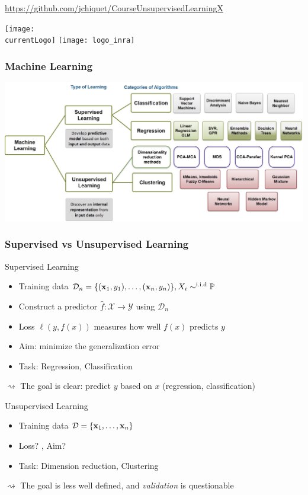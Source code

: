 \documentclass{beamer}\usepackage[]{graphicx}\usepackage[]{color}
\title{\currentCourse}
\subtitle{\huge\currentChapter\normalsize}
\institute{\currentInstitute}
\date{\currentDate}
\def\currentLogo{../common_figs/logo_X}
\newcommand{\dotitlepage}{%
  \begin{frame}
    \titlepage
    \vfill
    \begin{center}
        \scriptsize\url{https://github.com/jchiquet/CourseUnsupervisedLearningX}
    \end{center}
    \vfill
    \texttt{[image: \\currentLogo]}\hfill
    \texttt{[image: logo\_inra]}
  \end{frame}
}
\begin{document}
\dotitlepage

\begin{frame}
	\frametitle{Machine Learning}

	\begin{center}
		\includegraphics[width=\textwidth]{figures/Learning+Types.jpg}
	\end{center}

\end{frame}

\begin{frame}
  \frametitle{Supervised vs Unsupervised Learning}
  
  \begin{block}{Supervised Learning}
    \begin{itemize}
    \item Training data $\mathcal{D}_n = \{(\mathbf{x}_1, y_1), \ldots, (\mathbf{x}_n, y_n)\}, X_i \sim^{\text{i.i.d}} \mathbb{P}$
    \item Construct a predictor $\hat f : \mathcal{X} \rightarrow \mathcal{Y}$ using $\mathcal{D}_n$
    \item Loss $\ell(y, f(x))$ measures how well $f(x)$ predicts $y$
    \item Aim: minimize the generalization error
    \item Task: Regression, Classification
    \end{itemize}
    $\rightsquigarrow$ The goal is clear: predict $y$ based on $x$ (regression, classification)
  \end{block}

  \begin{block}{Unsupervised Learning}
  \begin{itemize}
    \item Training data $\mathcal{D} = \{\mathbf{x}_1, \ldots, \mathbf{x}_n\}$
    \item Loss? , Aim?
    \item Task: Dimension reduction, Clustering
  \end{itemize}  
  $\rightsquigarrow$ The goal is less well defined, and \emph{validation} is questionable
  \end{block}
  
\end{frame}
\end{document}

